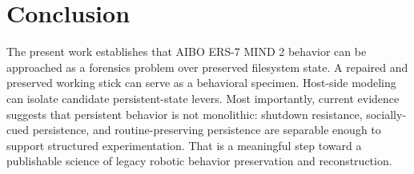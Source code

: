 \section{Conclusion}
The present work establishes that AIBO ERS-7 MIND 2 behavior can be approached
as a forensics problem over preserved filesystem state. A repaired and
preserved working stick can serve as a behavioral specimen. Host-side modeling
can isolate candidate persistent-state levers. Most importantly, current
evidence suggests that persistent behavior is not monolithic: shutdown
resistance, socially-cued persistence, and routine-preserving persistence are
separable enough to support structured experimentation. That is a meaningful
step toward a publishable science of legacy robotic behavior preservation and
reconstruction.
